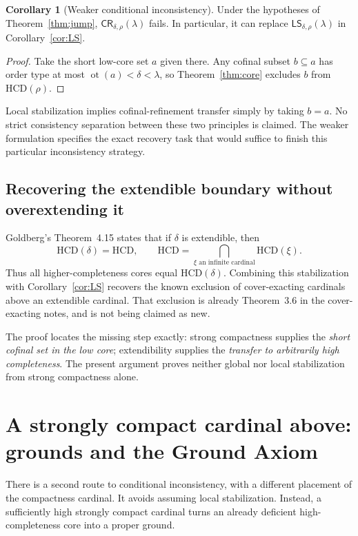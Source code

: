\documentclass[11pt,letterpaper]{article}
\theoremstyle{definition}
\newtheorem{corollary}[definition]{Corollary}
\newcommand{\ot}{\operatorname{ot}}
\newcommand{\HCD}{\mathrm{HCD}}
\newcommand{\LS}{\mathsf{LS}}
\newcommand{\CR}{\mathsf{CR}}
\begin{document}
\begin{corollary}[Weaker conditional inconsistency]\label{cor:CR}
Under the hypotheses of Theorem~\ref{thm:jump}, $\CR_{\delta,\rho}(\lambda)$ fails. In particular, it can replace $\LS_{\delta,\rho}(\lambda)$ in Corollary~\ref{cor:LS}.
\end{corollary}

\begin{proof}
Take the short low-core set $a$ given there. Any cofinal subset $b\subseteq a$ has order type at most $\ot(a)<\delta<\lambda$, so Theorem~\ref{thm:core} excludes $b$ from $\HCD(\rho)$.
\end{proof}

Local stabilization implies cofinal-refinement transfer simply by taking $b=a$. No strict consistency separation between these two principles is claimed. The weaker formulation specifies the exact recovery task that would suffice to finish this particular inconsistency strategy.

\subsection{Recovering the extendible boundary without overextending it}

Goldberg's Theorem~4.15 states that if $\delta$ is extendible, then
\[
 \HCD(\delta)=\HCD,
 \qquad \HCD=\bigcap_{\xi\text{ an infinite cardinal}}\HCD(\xi).
\]
Thus all higher-completeness cores equal $\HCD(\delta)$.\cite{uniqueness} Combining this stabilization with Corollary~\ref{cor:LS} recovers the known exclusion of cover-exacting cardinals above an extendible cardinal. That exclusion is already Theorem~3.6 in the cover-exacting notes, and is not being claimed as new.\cite{cover}

The proof locates the missing step exactly: strong compactness supplies the \emph{short cofinal set in the low core}; extendibility supplies the \emph{transfer to arbitrarily high completeness}. The present argument proves neither global nor local stabilization from strong compactness alone.

\section{A strongly compact cardinal above: grounds and the Ground Axiom}\label{sec:grounds}

There is a second route to conditional inconsistency, with a different placement of the compactness cardinal. It avoids assuming local stabilization. Instead, a sufficiently high strongly compact cardinal turns an already deficient high-completeness core into a proper ground.
\end{document}
